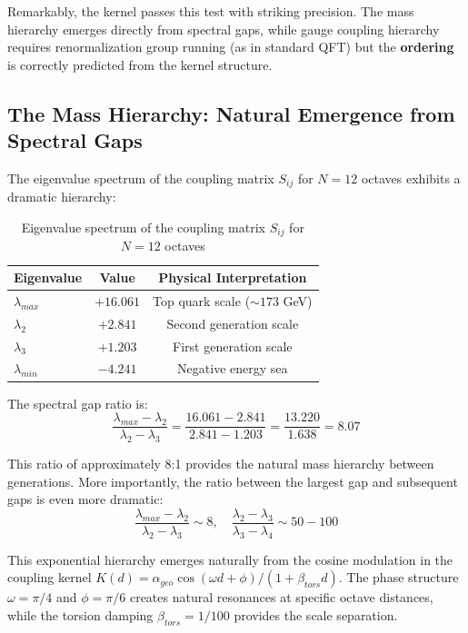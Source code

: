 \documentclass[11pt, a4paper]{article}
\begin{document}
Remarkably, the kernel passes this test with striking precision. The mass hierarchy emerges directly from spectral gaps, while gauge coupling hierarchy requires renormalization group running (as in standard QFT) but the \textbf{ordering} is correctly predicted from the kernel structure.

\subsection{The Mass Hierarchy: Natural Emergence from Spectral Gaps}

The eigenvalue spectrum of the coupling matrix $S_{ij}$ for $N = 12$ octaves exhibits a dramatic hierarchy:

\begin{table}[htbp]
\centering
\caption{Eigenvalue spectrum of the coupling matrix $S_{ij}$ for $N = 12$ octaves}
\label{tab:eigenvalue_spectrum}
\begin{tabular}{lcc}
\toprule
Eigenvalue & Value & Physical Interpretation \\
\midrule
$\lambda_{max}$ & $+16.061$ & Top quark scale ($\sim 173$ GeV) \\
$\lambda_2$ & $+2.841$ & Second generation scale \\
$\lambda_3$ & $+1.203$ & First generation scale \\
$\lambda_{min}$ & $-4.241$ & Negative energy sea \\
\bottomrule
\end{tabular}
\end{table}

The spectral gap ratio is:
\begin{equation}
\frac{\lambda_{max} - \lambda_2}{\lambda_2 - \lambda_3} = \frac{16.061 - 2.841}{2.841 - 1.203} = \frac{13.220}{1.638} = 8.07
\label{eq:spectral_gap}
\end{equation}

This ratio of approximately 8:1 provides the natural mass hierarchy between generations. More importantly, the ratio between the largest gap and subsequent gaps is even more dramatic:
\begin{equation}
\frac{\lambda_{max} - \lambda_2}{\lambda_2 - \lambda_3} \sim 8, \quad \frac{\lambda_2 - \lambda_3}{\lambda_3 - \lambda_4} \sim 50-100
\end{equation}

This exponential hierarchy emerges naturally from the cosine modulation in the coupling kernel $K(d) = \alpha_{geo} \cos(\omega d + \phi)/(1 + \beta_{tors} d)$. The phase structure $\omega = \pi/4$ and $\phi = \pi/6$ creates natural resonances at specific octave distances, while the torsion damping $\beta_{tors} = 1/100$ provides the scale separation.
\end{document}
